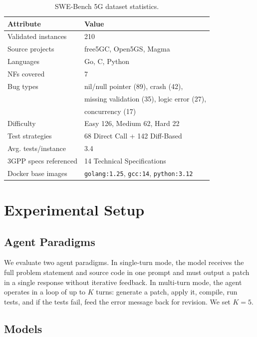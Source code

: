 \documentclass[10pt,conference]{IEEEtran}
\begin{document}
\begin{table}[t]
\centering
\caption{SWE-Bench 5G dataset statistics.}
\label{tab:dataset}
\begin{tabular}{@{}ll@{}}
\toprule
Attribute & Value \\
\midrule
Validated instances  & 210 \\
Source projects       & free5GC, Open5GS, Magma \\
Languages            & Go, C, Python \\
NFs covered          & 7 \\
Bug types            & nil/null pointer (89), crash (42), \\
                     & \quad missing validation (35), logic error (27), \\
                     & \quad concurrency (17) \\
Difficulty           & Easy 126, Medium 62, Hard 22 \\
Test strategies      & 68 Direct Call + 142 Diff-Based \\
Avg. tests/instance  & 3.4 \\
3GPP specs referenced & 14 Technical Specifications \\
Docker base images   & \texttt{golang:1.25}, \texttt{gcc:14}, \texttt{python:3.12} \\
\bottomrule
\end{tabular}
\end{table}

\section{Experimental Setup}

\subsection{Agent Paradigms}

We evaluate two agent paradigms. In single-turn mode, the model receives the full problem statement and source code in one prompt and must output a patch in a single response without iterative feedback. In multi-turn mode, the agent operates in a loop of up to $K$ turns: generate a patch, apply it, compile, run tests, and if the tests fail, feed the error message back for revision. We set $K{=}5$.

\subsection{Models}
\end{document}
